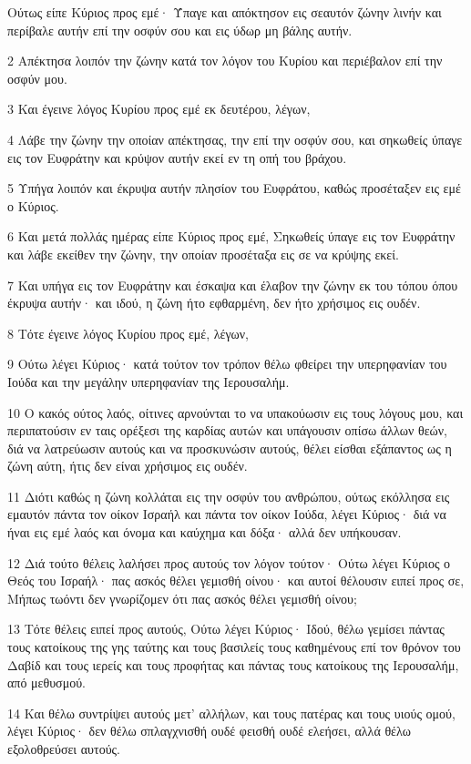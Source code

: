 \par Ούτως είπε Κύριος προς εμέ· Ύπαγε και απόκτησον εις σεαυτόν ζώνην λινήν και περίβαλε αυτήν επί την οσφύν σου και εις ύδωρ μη βάλης αυτήν.
\par 2 Απέκτησα λοιπόν την ζώνην κατά τον λόγον του Κυρίου και περιέβαλον επί την οσφύν μου.
\par 3 Και έγεινε λόγος Κυρίου προς εμέ εκ δευτέρου, λέγων,
\par 4 Λάβε την ζώνην την οποίαν απέκτησας, την επί την οσφύν σου, και σηκωθείς ύπαγε εις τον Ευφράτην και κρύψον αυτήν εκεί εν τη οπή του βράχου.
\par 5 Υπήγα λοιπόν και έκρυψα αυτήν πλησίον του Ευφράτου, καθώς προσέταξεν εις εμέ ο Κύριος.
\par 6 Και μετά πολλάς ημέρας είπε Κύριος προς εμέ, Σηκωθείς ύπαγε εις τον Ευφράτην και λάβε εκείθεν την ζώνην, την οποίαν προσέταξα εις σε να κρύψης εκεί.
\par 7 Και υπήγα εις τον Ευφράτην και έσκαψα και έλαβον την ζώνην εκ του τόπου όπου έκρυψα αυτήν· και ιδού, η ζώνη ήτο εφθαρμένη, δεν ήτο χρήσιμος εις ουδέν.
\par 8 Τότε έγεινε λόγος Κυρίου προς εμέ, λέγων,
\par 9 Ούτω λέγει Κύριος· κατά τούτον τον τρόπον θέλω φθείρει την υπερηφανίαν του Ιούδα και την μεγάλην υπερηφανίαν της Ιερουσαλήμ.
\par 10 Ο κακός ούτος λαός, οίτινες αρνούνται το να υπακούωσιν εις τους λόγους μου, και περιπατούσιν εν ταις ορέξεσι της καρδίας αυτών και υπάγουσιν οπίσω άλλων θεών, διά να λατρεύωσιν αυτούς και να προσκυνώσιν αυτούς, θέλει είσθαι εξάπαντος ως η ζώνη αύτη, ήτις δεν είναι χρήσιμος εις ουδέν.
\par 11 Διότι καθώς η ζώνη κολλάται εις την οσφύν του ανθρώπου, ούτως εκόλλησα εις εμαυτόν πάντα τον οίκον Ισραήλ και πάντα τον οίκον Ιούδα, λέγει Κύριος· διά να ήναι εις εμέ λαός και όνομα και καύχημα και δόξα· αλλά δεν υπήκουσαν.
\par 12 Διά τούτο θέλεις λαλήσει προς αυτούς τον λόγον τούτον· Ούτω λέγει Κύριος ο Θεός του Ισραήλ· πας ασκός θέλει γεμισθή οίνου· και αυτοί θέλουσιν ειπεί προς σε, Μήπως τωόντι δεν γνωρίζομεν ότι πας ασκός θέλει γεμισθή οίνου;
\par 13 Τότε θέλεις ειπεί προς αυτούς, Ούτω λέγει Κύριος· Ιδού, θέλω γεμίσει πάντας τους κατοίκους της γης ταύτης και τους βασιλείς τους καθημένους επί τον θρόνον του Δαβίδ και τους ιερείς και τους προφήτας και πάντας τους κατοίκους της Ιερουσαλήμ, από μεθυσμού.
\par 14 Και θέλω συντρίψει αυτούς μετ' αλλήλων, και τους πατέρας και τους υιούς ομού, λέγει Κύριος· δεν θέλω σπλαγχνισθή ουδέ φεισθή ουδέ ελεήσει, αλλά θέλω εξολοθρεύσει αυτούς.
